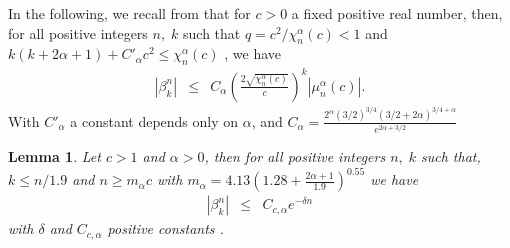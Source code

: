 \documentclass[]{article}
\newtheorem{lemma}{Lemma}
\newcounter{rea}
\begin{document}
In the following, we recall from \cite{Karoui-Souabni1} that for $c > 0$ a fixed positive real number, then, for all positive integers
$n,\; k$ such that $q=c^2/\chi^{\alpha}_{n}(c) <1$ and $ k(k+2\alpha+1)+C'_{\alpha}c^2\leq \chi_n^{\alpha}(c)$ , we have
\begin{eqnarray}
|\beta_k^n|&\leq& C_{\alpha}\left(\frac{2\sqrt{\chi_{n}^{\alpha}(c)}}{c} \right)^k |\mu_{n}^{\alpha}(c)|.\label{9}
\end{eqnarray}
With $C'_{\alpha}$ a constant depends only on $\alpha$, and $ {\displaystyle C_{\alpha}=\frac{2^{\alpha}(3/2)^{3/4}(3/2+2\alpha)^{3/4+\alpha}}{e^{2\alpha+3/2}}}$
\begin{lemma}\label{decaybeta}
	Let $c>1$ and $\alpha  >0$, then  for all positive integers $n,\; k$ such that, $k\leq n/1.9$ and
	$n\geq m_{\alpha}c$ with $m_{\alpha}=4.13\left(1.28+\frac{2\alpha+1}{1.9}\right)^{0.55}$
	we have
	\begin{eqnarray}
	|\beta_k^n| &\leq & C_{c,\alpha}e^{-\delta n}\label{10}
	\end{eqnarray}
	with $\delta$ and $C_{c,\alpha}$ positive  constants .
\end{lemma}
\end{document}
